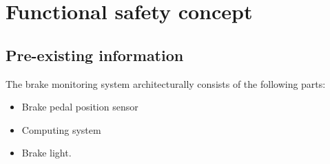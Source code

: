 \section{Functional safety concept}
%
% 

\subsection{Pre-existing information}
%
The brake monitoring system architecturally consists of the following parts:
\begin{itemize}
\item Brake pedal position sensor
\item Computing system
\item Brake light.
\end{itemize}

